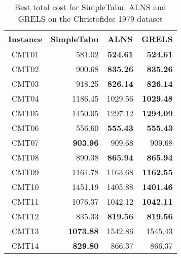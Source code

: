 \begin{table}[]
\centering
\begin{tabular}{ |c|r|r|r| }
\hline
\multicolumn{1}{|c|}{ \textbf{ Instance } } & \multicolumn{1}{c|}{ \textbf{ SimpleTabu } } & \multicolumn{1}{c|}{ \textbf{ ALNS } } & \multicolumn{1}{c|}{ \textbf{ GRELS } } \\ \hline
CMT01 & 581.02 & \textbf{ 524.61 } & \textbf{ 524.61 } \\ \hline
CMT02 & 900.68 & \textbf{ 835.26 } & \textbf{ 835.26 } \\ \hline
CMT03 & 918.25 & \textbf{ 826.14 } & \textbf{ 826.14 } \\ \hline
CMT04 & 1186.45 & 1029.56 & \textbf{ 1029.48 } \\ \hline
CMT05 & 1450.05 & 1297.12 & \textbf{ 1294.09 } \\ \hline
CMT06 & 556.60 & \textbf{ 555.43 } & \textbf{ 555.43 } \\ \hline
CMT07 & \textbf{ 903.96 } & 909.68 & 909.68 \\ \hline
CMT08 & 890.38 & \textbf{ 865.94 } & \textbf{ 865.94 } \\ \hline
CMT09 & 1164.78 & 1163.68 & \textbf{ 1162.55 } \\ \hline
CMT10 & 1451.19 & 1405.88 & \textbf{ 1401.46 } \\ \hline
CMT11 & 1076.37 & 1042.12 & \textbf{ 1042.11 } \\ \hline
CMT12 & 835.33 & \textbf{ 819.56 } & \textbf{ 819.56 } \\ \hline
CMT13 & \textbf{ 1073.88 } & 1542.86 & 1545.43 \\ \hline
CMT14 & \textbf{ 829.80 } & 866.37 & 866.37 \\ \hline
\end{tabular}
\caption{ Best total cost for SimpleTabu, ALNS and GRELS on the Christofides 1979 dataset }
\label{ tab:compare-others-cmt }
\end{table}
